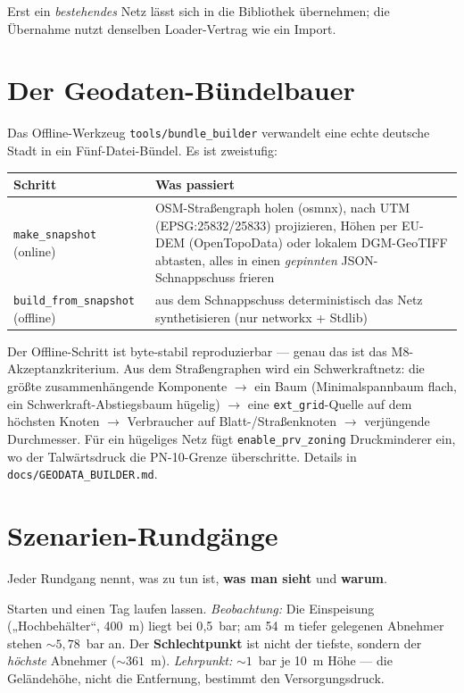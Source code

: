 \documentclass[11pt,a4paper,parskip=half]{scrreprt}
\newcommand{\file}[1]{\texttt{#1}}              %
\begin{document}
Erst ein \emph{bestehendes} Netz lässt sich in die Bibliothek übernehmen; die
Übernahme nutzt denselben Loader-Vertrag wie ein Import.

\chapter{Der Geodaten-Bündelbauer}
\label{ch:geodaten}

Das Offline-Werkzeug \file{tools/bundle\_builder} verwandelt eine echte deutsche
Stadt in ein Fünf-Datei-Bündel. Es ist zweistufig:

\begin{center}
\small
\begin{tabularx}{\linewidth}{@{}lX@{}}
\toprule
Schritt & Was passiert \\
\midrule
\texttt{make\_snapshot} (online) & OSM-Straßengraph holen (osmnx), nach UTM
  (EPSG:25832/25833) projizieren, Höhen per EU-DEM (OpenTopoData) oder lokalem
  DGM-GeoTIFF abtasten, alles in einen \emph{gepinnten} JSON-Schnappschuss frieren \\
\texttt{build\_from\_snapshot} (offline) & aus dem Schnappschuss deterministisch
  das Netz synthetisieren (nur networkx + Stdlib) \\
\bottomrule
\end{tabularx}
\end{center}

Der Offline-Schritt ist byte-stabil reproduzierbar — genau das ist das
M8-Akzeptanzkriterium. Aus dem Straßengraphen wird ein Schwerkraftnetz: die größte
zusammenhängende Komponente $\to$ ein Baum (Minimalspannbaum flach, ein
Schwerkraft-Abstiegsbaum hügelig) $\to$ eine \texttt{ext\_grid}-Quelle auf dem
höchsten Knoten $\to$ Verbraucher auf Blatt-/Straßenknoten $\to$ verjüngende
Durchmesser. Für ein hügeliges Netz fügt \texttt{enable\_prv\_zoning} Druckminderer
ein, wo der Talwärtsdruck die PN-10-Grenze überschritte. Details in
\file{docs/GEODATA\_BUILDER.md}.

\chapter{Szenarien-Rundgänge}
\label{ch:rundgaenge}

Jeder Rundgang nennt, was zu tun ist, \textbf{was man sieht} und \textbf{warum}.

\begin{beispiel}
Starten und einen Tag laufen lassen. \emph{Beobachtung:} Die Einspeisung
(„Hochbehälter“, 400~m) liegt bei 0{,}5~bar; am 54~m tiefer gelegenen Abnehmer
stehen $\sim5{,}78$~bar an. Der \textbf{Schlechtpunkt} ist nicht der tiefste,
sondern der \emph{höchste} Abnehmer ($\sim361$~m). \emph{Lehrpunkt:} $\sim1$~bar je
10~m Höhe — die Geländehöhe, nicht die Entfernung, bestimmt den Versorgungsdruck.
\end{beispiel}
\end{document}
